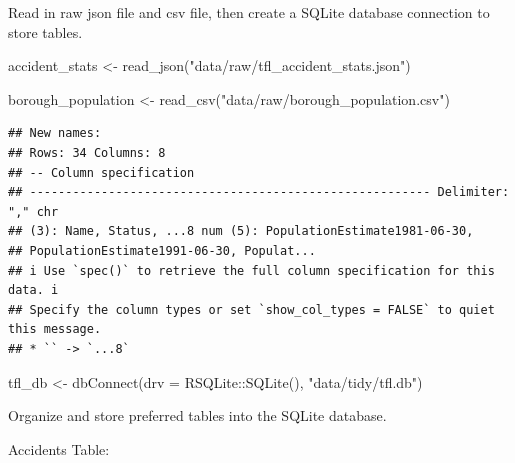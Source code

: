 \documentclass[
]{article}
\newenvironment{Shaded}{\begin{snugshade}}{\end{snugshade}}
\newcommand{\AttributeTok}[1]{\textcolor[rgb]{0.77,0.63,0.00}{#1}}
\newcommand{\FunctionTok}[1]{\textcolor[rgb]{0.00,0.00,0.00}{#1}}
\newcommand{\NormalTok}[1]{#1}
\newcommand{\OtherTok}[1]{\textcolor[rgb]{0.56,0.35,0.01}{#1}}
\newcommand{\SpecialCharTok}[1]{\textcolor[rgb]{0.00,0.00,0.00}{#1}}
\newcommand{\StringTok}[1]{\textcolor[rgb]{0.31,0.60,0.02}{#1}}
\begin{document}
Read in raw json file and csv file, then create a SQLite database
connection to store tables.

\begin{Shaded}
\begin{Highlighting}[]
\NormalTok{accident\_stats }\OtherTok{\textless{}{-}} \FunctionTok{read\_json}\NormalTok{(}\StringTok{"data/raw/tfl\_accident\_stats.json"}\NormalTok{)}
                 
\NormalTok{borough\_population }\OtherTok{\textless{}{-}} \FunctionTok{read\_csv}\NormalTok{(}\StringTok{"data/raw/borough\_population.csv"}\NormalTok{)}
\end{Highlighting}
\end{Shaded}

\begin{verbatim}
## New names:
## Rows: 34 Columns: 8
## -- Column specification
## -------------------------------------------------------- Delimiter: "," chr
## (3): Name, Status, ...8 num (5): PopulationEstimate1981-06-30,
## PopulationEstimate1991-06-30, Populat...
## i Use `spec()` to retrieve the full column specification for this data. i
## Specify the column types or set `show_col_types = FALSE` to quiet this message.
## * `` -> `...8`
\end{verbatim}

\begin{Shaded}
\begin{Highlighting}[]
\NormalTok{tfl\_db }\OtherTok{\textless{}{-}} \FunctionTok{dbConnect}\NormalTok{(}\AttributeTok{drv =}\NormalTok{ RSQLite}\SpecialCharTok{::}\FunctionTok{SQLite}\NormalTok{(),}
                 \StringTok{"data/tidy/tfl.db"}\NormalTok{) }
\end{Highlighting}
\end{Shaded}

Organize and store preferred tables into the SQLite database.

Accidents Table:
\end{document}
